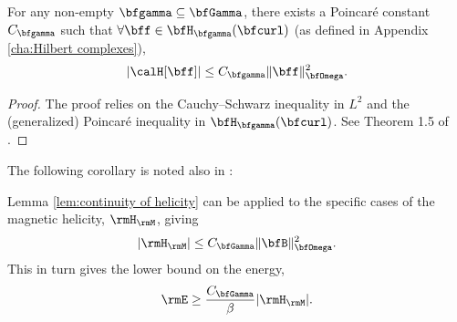     \line

    \begin{lemma}\label{lem:continuity of helicity}
        For any non-empty $\bfgamma  \subseteq  \bfGamma$, there exists a Poincaré constant $C_{\bfgamma}$ such that $\forall  \bff  \in  \bfH_{\bfgamma}(\bfcurl)$ (as defined in Appendix \ref{cha:Hilbert complexes}),
        \begin{equation}
            |\calH[\bff]|  \leq  C_{\bfgamma}\|\bff\|_{\bfOmega}^{2}.
        \end{equation}
    \end{lemma}
    \begin{proof}
        The proof relies on the Cauchy--Schwarz inequality in $L^{2}$ and the (generalized) Poincaré inequality in $\bfH_{\bfgamma}(\bfcurl)$. See Theorem 1.5 of \cite{Arnold_Khesin_2008}. 
    \end{proof}

    The following corollary is noted also in \cite{Arnold_Khesin_2008}:

    \begin{corollary}
        Lemma \ref{lem:continuity of helicity} can be applied to the specific cases of the magnetic helicity, $\rmH_{\rmM}$, giving
        \begin{equation}
            |\rmH_{\rmM}|  \leq  C_{\bfGamma}\|\bfB\|_{\bfOmega}^{2}.
        \end{equation}
        This in turn gives the lower bound on the energy,
        \begin{equation}
            \rmE  \geq  \frac{C_{\bfGamma}}{\beta}|\rmH_{\rmM}|.
        \end{equation}
    \end{corollary}


    \line
